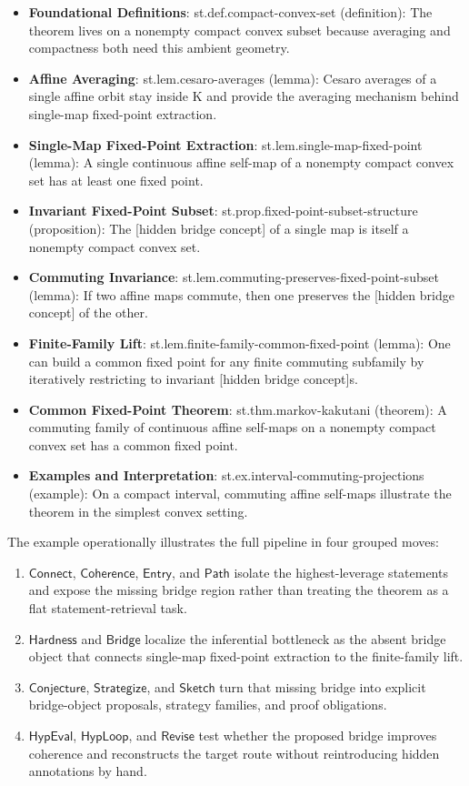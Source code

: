 \documentclass[11pt]{article}
\begin{document}
\begin{itemize}[leftmargin=*,itemsep=0.2em]
\item \textbf{Foundational Definitions}: st.def.compact-convex-set (definition): The theorem lives on a nonempty compact convex subset because averaging and compactness both need this ambient geometry.
\item \textbf{Affine Averaging}: st.lem.cesaro-averages (lemma): Cesaro averages of a single affine orbit stay inside K and provide the averaging mechanism behind single-map fixed-point extraction.
\item \textbf{Single-Map Fixed-Point Extraction}: st.lem.single-map-fixed-point (lemma): A single continuous affine self-map of a nonempty compact convex set has at least one fixed point.
\item \textbf{Invariant Fixed-Point Subset}: st.prop.fixed-point-subset-structure (proposition): The [hidden bridge concept] of a single map is itself a nonempty compact convex set.
\item \textbf{Commuting Invariance}: st.lem.commuting-preserves-fixed-point-subset (lemma): If two affine maps commute, then one preserves the [hidden bridge concept] of the other.
\item \textbf{Finite-Family Lift}: st.lem.finite-family-common-fixed-point (lemma): One can build a common fixed point for any finite commuting subfamily by iteratively restricting to invariant [hidden bridge concept]s.
\item \textbf{Common Fixed-Point Theorem}: st.thm.markov-kakutani (theorem): A commuting family of continuous affine self-maps on a nonempty compact convex set has a common fixed point.
\item \textbf{Examples and Interpretation}: st.ex.interval-commuting-projections (example): On a compact interval, commuting affine self-maps illustrate the theorem in the simplest convex setting.
\end{itemize}
The example operationally illustrates the full pipeline in four grouped moves:
\begin{enumerate}[leftmargin=*,itemsep=0.25em]
\item $\mathsf{Connect}$, $\mathsf{Coherence}$, $\mathsf{Entry}$, and $\mathsf{Path}$ isolate the highest-leverage statements and expose the missing bridge region rather than treating the theorem as a flat statement-retrieval task.
\item $\mathsf{Hardness}$ and $\mathsf{Bridge}$ localize the inferential bottleneck as the absent bridge object that connects single-map fixed-point extraction to the finite-family lift.
\item $\mathsf{Conjecture}$, $\mathsf{Strategize}$, and $\mathsf{Sketch}$ turn that missing bridge into explicit bridge-object proposals, strategy families, and proof obligations.
\item $\mathsf{HypEval}$, $\mathsf{HypLoop}$, and $\mathsf{Revise}$ test whether the proposed bridge improves coherence and reconstructs the target route without reintroducing hidden annotations by hand.
\end{enumerate}
\end{document}
